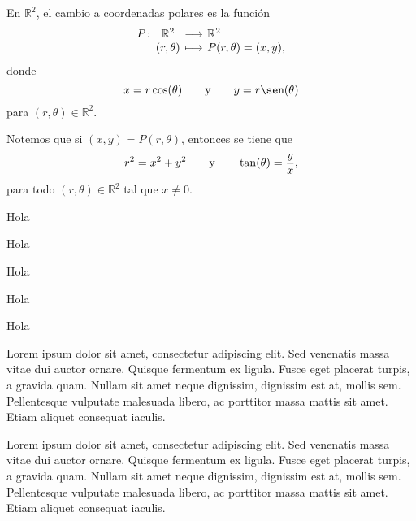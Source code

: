 \documentclass[a4]{aleph-notas-beta}
\begin{document}
\encabezado

\begin{defi}
    En $\mathbb{R}^2$, el cambio a coordenadas polares es la función
    \[
        \funcion{P}{\mathbb{R}^2}{\mathbb{R}^2}
        {(r,\theta)}{P(r , \theta)=(x,y),}
    \]
    donde
    \[
        x= r\cos(\theta)
        \texty
        y= r\sen(\theta)
    \]
    para $(r,\theta)\in \mathbb{R}^2$.
\end{defi}

\begin{advertencia}
    Notemos que si $(x,y)=P(r,\theta)$, entonces se tiene que
    \[
        r^2=x^2+y^2
        \qquad\text{y}\qquad
        \tan(\theta)=\frac y x,
    \]  
    para todo $(r,\theta)\in\mathbb{R}^2$ tal que $x\neq 0$.
\end{advertencia}

\begin{teo}
    Hola
\end{teo}

\begin{teo}
    Hola
\end{teo}

\begin{cor}
    Hola
\end{cor}

\begin{cor}[Título]
    Hola
\end{cor}

\begin{lem}
    Hola
\end{lem}

\begin{obs}
    Lorem ipsum dolor sit amet, consectetur adipiscing elit. Sed venenatis massa vitae dui auctor ornare. Quisque fermentum ex ligula. Fusce eget placerat turpis, a gravida quam. Nullam sit amet neque dignissim, dignissim est at, mollis sem. Pellentesque vulputate malesuada libero, ac porttitor massa mattis sit amet. Etiam aliquet consequat iaculis.
\end{obs}

\begin{ejem}
    Lorem ipsum dolor sit amet, consectetur adipiscing elit. Sed venenatis massa vitae dui auctor ornare. Quisque fermentum ex ligula. Fusce eget placerat turpis, a gravida quam. Nullam sit amet neque dignissim, dignissim est at, mollis sem. Pellentesque vulputate malesuada libero, ac porttitor massa mattis sit amet. Etiam aliquet consequat iaculis.
\end{ejem}
\end{document}

